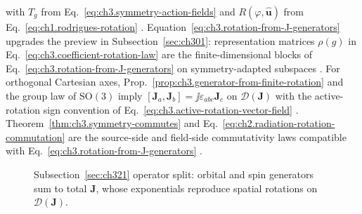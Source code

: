 with \(T_g\) from Eq.~\eqref{eq:ch3.symmetry-action-fields} and \(R(\varphi,\hat{\mathbf{u}})\) from
Eq.~\eqref{eq:ch1.rodrigues-rotation} \cite{jackson1999}. Equation~\eqref{eq:ch3.rotation-from-J-generators}
upgrades the preview in Subsection~\ref{sec:ch301}: representation matrices \(\rho(g)\) in
Eq.~\eqref{eq:ch3.coefficient-rotation-law} are the finite-dimensional blocks of
Eq.~\eqref{eq:ch3.rotation-from-J-generators} on symmetry-adapted subspaces \cite{jackson1999}.
For orthogonal Cartesian axes, Prop.~\ref{prop:ch3.generator-from-finite-rotation} and the group law of
$\mathrm{SO}(3)$ imply $[\mathbf{J}_a,\mathbf{J}_b]=\jj\varepsilon_{abc}\mathbf{J}_c$ on
$\mathcal{D}(\mathbf{J})$ with the active-rotation sign convention of Eq.~\eqref{eq:ch3.active-rotation-vector-field}
\cite{jackson1999}.
Theorem~\ref{thm:ch3.symmetry-commutes} and Eq.~\eqref{eq:ch2.radiation-rotation-commutation} are the
source-side and field-side commutativity laws compatible with
Eq.~\eqref{eq:ch3.rotation-from-J-generators} \cite{stratton1941}.
\begin{figure}[t]
\centering
{}
\caption{Subsection~\ref{sec:ch321} operator split: orbital and spin generators sum to total
\(\mathbf{J}\), whose exponentials reproduce spatial rotations on \(\mathcal{D}(\mathbf{J})\).}
\label{fig:ch3.J-orbital-spin-split}
\end{figure}

